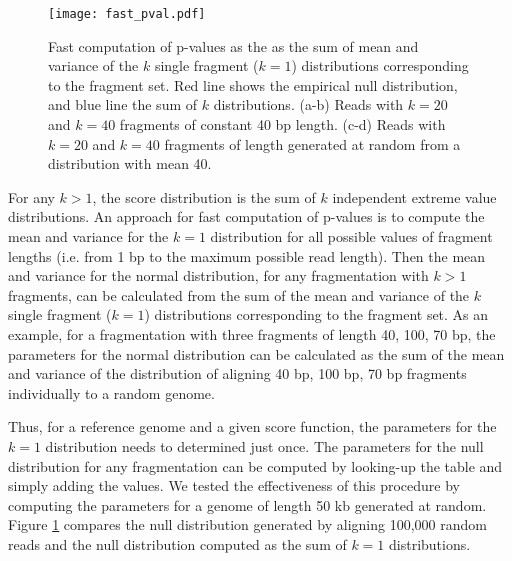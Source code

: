\begin{figure}[t!]
\centering
\texttt{[image: fast\_pval.pdf]}
\caption[Fast computation of p-values]{
  Fast computation of p-values as the as the sum of mean and variance of
  the $k$ single fragment ($k=1$) distributions corresponding to the
  fragment set.
  Red line shows the empirical null distribution, and blue line the sum
  of $k$ distributions.
  (a-b) Reads with $k=20$ and $k=40$ fragments of constant 40 bp length.
  (c-d) Reads with $k=20$ and $k=40$ fragments of length generated at
  random from a distribution with mean 40.}
\label{fast_pval}
\end{figure}

For any $k > 1$, the score distribution is the sum of $k$ independent
extreme value distributions. An approach for fast computation of
p-values is to compute the mean and variance for the $k=1$ distribution
for all possible values of fragment lengths (i.e. from 1 bp to the
maximum possible read length). Then the mean and variance for the normal
distribution, for any fragmentation with $k > 1$ fragments, can be
calculated from the sum of the mean and variance of the $k$ single
fragment ($k=1$) distributions corresponding to the fragment set.
%
As an example, for a fragmentation with three fragments of length 40,
100, 70 bp, the parameters for the normal distribution can be calculated
as the sum of the mean and variance of the distribution of aligning 40
bp, 100 bp, 70 bp fragments individually to a random genome.

Thus, for a reference genome and a given score function, the parameters
for the $k=1$ distribution needs to determined just once. The parameters
for the null distribution for any fragmentation can be computed by
looking-up the table and simply adding the values.
%
We tested the effectiveness of this procedure by computing the
parameters for a genome of length 50 kb generated at random. Figure
\ref{fast_pval} compares the null distribution generated by aligning
100,000 random reads and the null distribution computed as the sum of
$k=1$ distributions.


